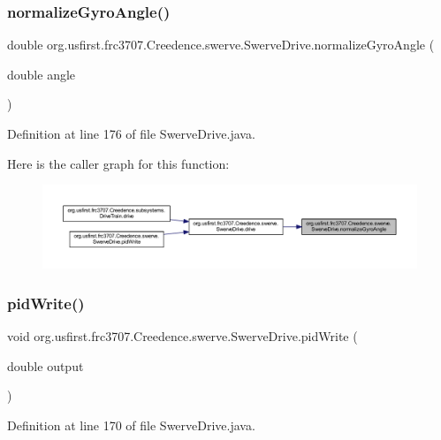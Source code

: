 \subsubsection{\texorpdfstring{normalizeGyroAngle()}{normalizeGyroAngle()}}
{\footnotesize\ttfamily double org.\+usfirst.\+frc3707.\+Creedence.\+swerve.\+Swerve\+Drive.\+normalize\+Gyro\+Angle (\begin{DoxyParamCaption}\item[{double}]{angle }\end{DoxyParamCaption})}



Definition at line 176 of file Swerve\+Drive.\+java.

Here is the caller graph for this function\+:
\nopagebreak
\begin{figure}[H]
\begin{center}
\leavevmode
\includegraphics[width=350pt]{classorg_1_1usfirst_1_1frc3707_1_1_creedence_1_1swerve_1_1_swerve_drive_a4a78f8451f4d7b85e3b88395a92a7218_icgraph}
\end{center}
\end{figure}
\mbox{\label{classorg_1_1usfirst_1_1frc3707_1_1_creedence_1_1swerve_1_1_swerve_drive_a887fecd8715cfa4d5576a3ea829bf6cb}} 
\subsubsection{\texorpdfstring{pidWrite()}{pidWrite()}}
{\footnotesize\ttfamily void org.\+usfirst.\+frc3707.\+Creedence.\+swerve.\+Swerve\+Drive.\+pid\+Write (\begin{DoxyParamCaption}\item[{double}]{output }\end{DoxyParamCaption})}



Definition at line 170 of file Swerve\+Drive.\+java.


